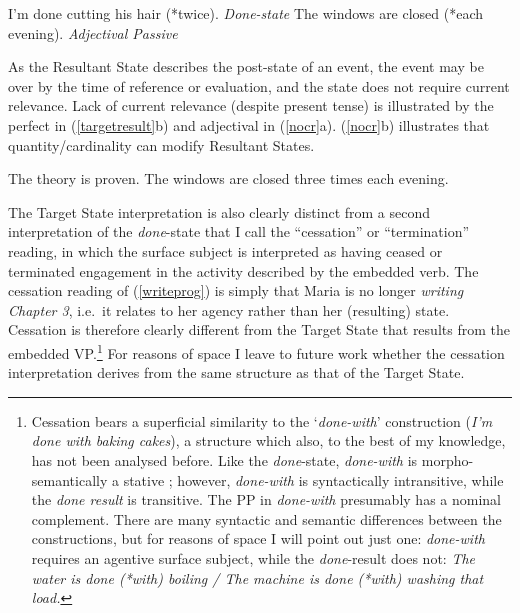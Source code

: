 \documentclass[output=paper,modfonts,nonflat]{langsci/langscibook}
\begin{document}
\begin{exe}
\ex\label{resst}
\begin{xlist}
\ex I'm done cutting his hair (*twice).  \hfill \emph{Done-state}
\ex The windows are closed (*each evening). \hfill \emph{Adjectival Passive}
\end{xlist}
\end{exe}

As the Resultant State describes the post-state of an event, the event may be over by the time of reference or evaluation, and the state does not require current relevance. Lack of current relevance (despite present tense) is illustrated by the perfect in (\ref{targetresult}b) and adjectival  in (\ref{nocr}a). (\ref{nocr}b) illustrates that quantity/cardinality  can modify Resultant States.

\begin{exe}
\ex\label{nocr}
\begin{xlist}
\ex The theory is proven.
\ex The windows are closed three times each evening.
\end{xlist}
\end{exe}

The Target State interpretation is also clearly distinct from a second
interpretation of the \emph{done}-state that I call the \enquote{cessation} or
\enquote{termination} reading, in which the surface subject is interpreted as
having ceased or terminated engagement in the activity described by the
embedded verb. The cessation reading of (\ref{writeprog}) is simply that Maria
is no longer \emph{writing Chapter 3}, i.e.\ it relates to her agency rather
than her (resulting) state. Cessation is therefore clearly different from the
Target State that results from the embedded VP\@.\footnote{Cessation bears a
    superficial similarity to the `{\em done-with}' construction (\emph{I'm
    done with baking cakes}), a structure which also, to the best of my
    knowledge, has not been analysed before. Like the \emph{done}-state, {\em
    done-with} is morpho-semantically a stative ; however, {\em
done-with} is syntactically intransitive, while the \emph{done result} is
transitive. The PP in {\em done-with} presumably has a nominal complement.
There are many syntactic and semantic differences between the constructions,
but for reasons of space I will point out just one: {\em done-with} requires an
agentive surface subject, while the {\em done}-result does not: \emph{The water
is done (*with) boiling /  The machine is done (*with) washing that load.}} For
reasons of space I leave to future work whether the cessation interpretation
derives from the same structure as that of the Target State.
\end{document}
